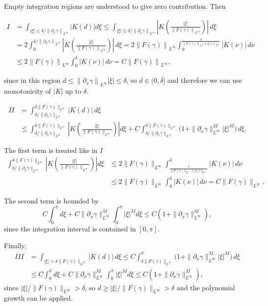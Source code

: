\documentclass[a4paper]{amsart}
\theoremstyle{definition}
\newcommand{\Np}[2][\infty]{\ensuremath{\left\|#2\right\|_{L^#1}}}
\begin{document}
    Empty integration regions are understood to give zero contribution. Then
    
    \begin{align*}
        I&=\int_{|\xi| \le \delta/\Np{\partial_x\gamma}} |K(d)|d\xi \le \int_{|\xi|\le\delta/\Np{\partial_x\gamma}} |K\left(\frac{|\xi|}{\Np{F(\gamma)}}\right)|\,d\xi\\& = 2\int_0^{\delta/\Np{\partial_x\gamma}} |K\left(\frac{|\xi|}{\Np{F(\gamma)}}\right)|\,d\xi = 2 \Np{F(\gamma)} \int_0^{\frac{\delta}{\Np{F(\gamma)} \Np{\partial_x\gamma}}} |K(\nu)|\,d\nu\\& \le 2\Np{F(\gamma)}\int_0^{\delta} |K(\nu)|\,d\nu = C \Np{F(\gamma)},
    \end{align*}
    
    since in this region \(d \le \Np{\partial_x\gamma}|\xi| \le \delta\), so \(d\in(0,\delta]\) and therefore we can use monotonicity of $|K|$ up to $\delta$.   

    \begin{align*}
    II&=
\int_{\delta/\|\partial_x\gamma\|_{L^\infty}}^{\delta\|F(\gamma)\|_{L^\infty}} |K(d)|\,d\xi 
\\&\le \int_{\delta/\|\partial_x\gamma\|_{L^\infty}}^{\delta\|F(\gamma)\|_{L^\infty}} \left|K\left(\frac{|\xi|}{\|F(\gamma)\|_{L^\infty}}\right)\right| d\xi + C\int_{\delta/\|\partial_x\gamma\|_{L^\infty}}^{\delta\|F(\gamma)\|_{L^\infty}} \bigl(1 + \|\partial_x\gamma\|_{L^\infty}^M |\xi|^M\bigr)\,d\xi.
\end{align*}

The first term is treated like in $I$
\begin{align*}
\int_{\delta/\|\partial_x\gamma\|_{L^\infty}}^{\delta\|F(\gamma)\|_{L^\infty}} \left|K\left(\frac{|\xi|}{\|F(\gamma)\|_{L^\infty}}\right)\right| d\xi
&\leq 2\|F(\gamma)\|_{L^\infty} \int_{\frac{\delta}{\|F(\gamma)\|_{L^\infty}\|\partial_x\gamma\|_{L^\infty}}}^{\delta} |K(\nu)|\,d\nu
\\&\le 2\|F(\gamma)\|_{L^\infty} \int_0^{\delta} |K(\nu)|\,d\nu = C\|F(\gamma)\|_{L^\infty}.
\end{align*}

The second term is bounded by
\[
C\int_0^{\pi} d\xi + C \|\partial_x\gamma\|_{L^\infty}^M \int_0^{\pi} |\xi|^M d\xi \le C(1 + \|\partial_x\gamma\|_{L^\infty}^M),
\]
since the integration interval is contained in \([0,\pi]\).

Finally,
\begin{align*}
    III&=\int_{|\xi|>\delta\|F(\gamma)\|_{L^\infty}} |K(d)|\,d\xi 
    \le C\int_{\delta\|F(\gamma)\|_{L^\infty}}^{\pi} \bigl(1 + \|\partial_x\gamma\|_{L^\infty}^M |\xi|^M\bigr)\,d\xi \\
    &\le C\int_0^{\pi} d\xi + C \|\partial_x\gamma\|_{L^\infty}^M \int_0^{\pi} |\xi|^M d\xi \le C(1 + \|\partial_x\gamma\|_{L^\infty}^M),
\end{align*}
since \(|\xi|/\|F(\gamma)\|_{L^\infty} > \delta\), so \(d \ge |\xi|/\|F(\gamma)\|_{L^\infty} > \delta\) and the polynomial growth can be applied.
    
\end{document}
